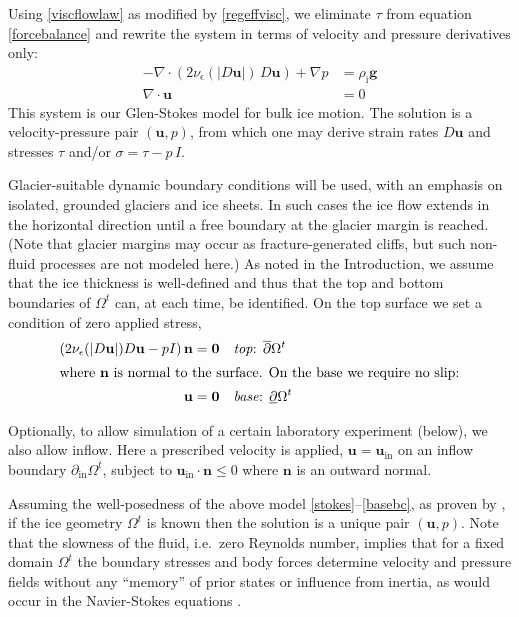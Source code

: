 \documentclass[letterpaper,final,12pt,reqno]{amsart}
\newcommand{\eps}{\epsilon}
\newcommand{\Div}{\nabla\cdot}
\newcommand{\bn}{\mathbf{n}}
\newcommand{\bu}{\mathbf{u}}
\newcommand{\bzero}{\bm{0}}
\newcommand{\rhoi}{\rho_{\text{i}}}
\begin{document}
Using \eqref{viscflowlaw} as modified by \eqref{regeffvisc}, we eliminate $\tau$ from equation \eqref{forcebalance} and rewrite the system in terms of velocity and pressure derivatives only:
\begin{align}
- \nabla \cdot \left(2 \nu_\eps(|D\bu|)\, D\bu\right) + \nabla p &= \rhoi \mathbf{g} \label{stokes} \\
\Div \bu &= 0 \label{incompagain}
\end{align}
This system is our Glen-Stokes model for bulk ice motion.  The solution is a velocity-pressure pair $(\bu,p)$, from which one may derive strain rates $D\bu$ and stresses $\tau$ and/or $\sigma = \tau - p\,I$.

Glacier-suitable dynamic boundary conditions will be used, with an emphasis on isolated, grounded glaciers and ice sheets.  In such cases the ice flow extends in the horizontal direction until a free boundary at the glacier margin is reached.  (Note that glacier margins may occur as fracture-generated cliffs, but such non-fluid processes are not modeled here.)  As noted in the Introduction, we assume that the ice thickness is well-defined and thus that the top and bottom boundaries of $\Omega^t$ can, at each time, be identified.  On the top surface we set a condition of zero applied stress,
\begin{align}
\left(2 \nu_\eps(|D\bu|) D\bu - pI\right) \bn &= \bzero  &&\text{\emph{top}: } \overline{\partial} \Omega^t \label{topbc} \\
\intertext{where $\bn$ is normal to the surface.  On the base we require no slip:}
\bu &= \bzero  &&\text{\emph{base}: } \underline{\partial} \Omega^t \label{basebc}
\end{align}

Optionally, to allow simulation of a certain laboratory experiment \cite{SayagWorster2013} (below), we also allow inflow.  Here a prescribed velocity is applied, $\bu = \bu_{\text{in}}$ on an inflow boundary $\partial_{\text{in}} \Omega^t$, subject to $\bu_{\text{in}}\cdot \bn \le 0$ where $\bn$ is an outward normal.

Assuming the well-posedness of the above model \eqref{stokes}--\eqref{basebc}, as proven by \cite{JouvetRappaz2011}, if the ice geometry $\Omega^t$ is known then the solution is a unique pair $(\bu,p)$.  Note that the slowness of the fluid, i.e.~zero Reynolds number, implies that for a fixed domain $\Omega^t$ the boundary stresses and body forces determine velocity and pressure fields without any ``memory'' of prior states or influence from inertia, as would occur in the Navier-Stokes equations \cite{Fowler1997}.
\end{document}
